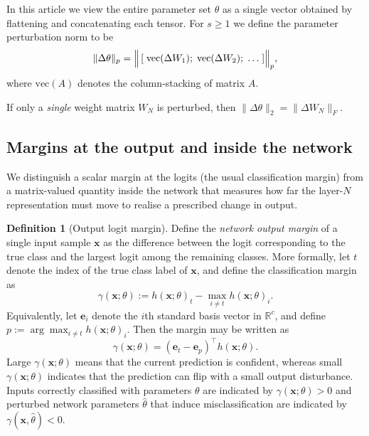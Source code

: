 \documentclass{article}
\theoremstyle{plain}
\theoremstyle{definition}
\newtheorem{definition}[theorem]{Definition}
\theoremstyle{remark}
\begin{document}
In this article we view the entire parameter set  \(\theta\)  as a single vector obtained by flattening and concatenating each tensor. For $s\geq 1$  we define the parameter perturbation norm  to be \[
\|\Delta\theta\|_p
=\Bigl\|\,[\;\mathrm{vec}(\Delta W_1);\;\mathrm{vec}(\Delta W_2);\;\dots\;]\Bigr\|_p,
\]
where \(\mathrm{vec}(A)\) denotes the column‐stacking of matrix \(A\).

If only a \emph{single} weight matrix $W_N$ is perturbed, then
\(
\|\Delta\theta\|_{2}=\|\Delta W_N\|_{F}.
\)



\subsection{Margins at the output and inside the network}
We distinguish a scalar margin at the logits (the usual classification margin) from a matrix-valued quantity inside the network that measures how far the layer-$N$ representation must move to realise a prescribed change in output.

\begin{definition}[Output logit margin]
Define the \emph{network output margin} of a single input sample $\mathbf{x}$ as the difference between the logit
corresponding to the true class and the largest logit among the remaining classes.
More formally, let $t$ denote the index of the true class label of $\mathbf{x}$, and define the classification
margin as
\[
\gamma(\mathbf{x};\theta)
:= h(\mathbf{x};\theta)_{t} - \max_{i \neq t} h(\mathbf{x};\theta)_{i}.
\]
Equivalently, let $\mathbf{e}_i$ denote the $i$th standard basis vector in $\mathbb{R}^c$, and define
\(
p := \arg\max_{i \neq t} h(\mathbf{x};\theta)_i .
\)
Then the margin may be written as
\[
\gamma(\mathbf{x};\theta)
= (\mathbf{e}_t - \mathbf{e}_p)^\top h(\mathbf{x};\theta).
\]
Large $\gamma(\mathbf x;\theta)$ means that the current prediction is confident, whereas small $\gamma( \mathbf x;\theta)$ indicates that the prediction can flip with a small output disturbance. Inputs correctly classified with parameters $\theta$ are indicated by $\gamma(\mathbf x;\theta)>0$ and perturbed network parameters $\hat{\theta}$ that induce misclassification are indicated by $\gamma( \mathbf x,\hat{\theta})<0$.
\end{definition}
\end{document}
